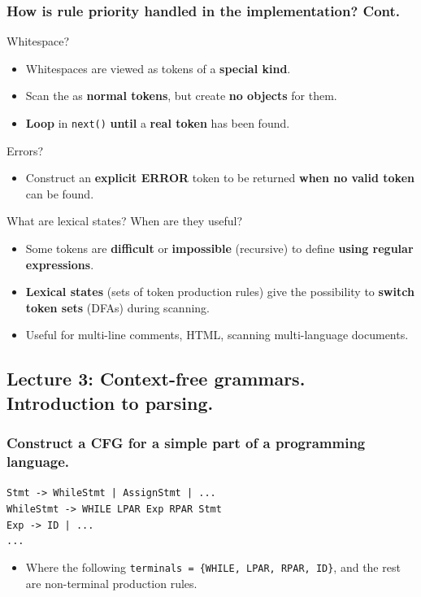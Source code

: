 \documentclass[11pt]{beamer}
\begin{document}
\begin{frame}
\frametitle{How is rule priority handled in the implementation? Cont.}

\begin{block}{Whitespace?}
\begin{itemize}
\item Whitespaces are viewed as tokens of a \textbf{special kind}.
\item Scan the as \textbf{normal tokens}, but create \textbf{no objects} for them.
\item \textbf{Loop} in \texttt{next()} \textbf{until} a \textbf{real token} has been found.
\end{itemize}
\end{block}

\begin{block}{Errors?}
\begin{itemize}
\item Construct an \textbf{explicit ERROR} token to be returned \textbf{when no valid token} can be found.
\end{itemize}
\end{block}

\end{frame}

\begin{frame}

\begin{block}{What are lexical states? When are they useful?}
\begin{itemize}
\item Some tokens are \textbf{difficult} or \textbf{impossible} (recursive) to define \textbf{using regular expressions}.
\item \textbf{Lexical states} (sets of token production rules) give the possibility to \textbf{switch token sets} (DFAs) during scanning.
\item Useful for multi-line comments, HTML, scanning multi-language documents.
\end{itemize}
\end{block}


\end{frame}

\subsection{Lecture 3: Context-free grammars. Introduction to parsing.}
\begin{frame}

\frametitle{Construct a CFG for a simple part of a programming language.	}
\texttt{Stmt -> WhileStmt | AssignStmt | ...}\\
\texttt{WhileStmt -> WHILE LPAR Exp RPAR Stmt}\\
\texttt{Exp -> ID | ...}\\
\texttt{...}\\
\begin{itemize}
\item Where the following \texttt{terminals = \{WHILE, LPAR, RPAR, ID\}}, and the rest are non-terminal production rules.
\end{itemize}

\end{frame}
\end{document}
